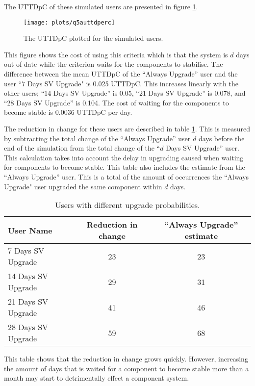 The UTTDpC of these simulated users are presented in figure \ref{exp.q5auttdperc}.
\begin{figure}[htp]
\begin{center}
  \texttt{[image: plots/q5auttdperc]}
  \caption{The UTTDpC plotted for the simulated users.}
  \label{exp.q5auttdperc}
\end{center}
\end{figure}

This figure shows the cost of using this criteria which is that the system is $d$ days out-of-date while the criterion waits for the components to stabilise.
The difference between the mean UTTDpC of the ``Always Upgrade'' user and the user ``7 Days SV Upgrade" is 0.025 UTTDpC.
This increases linearly with the other users; ``14 Days SV Upgrade'' is 0.05, ``21 Days SV Upgrade'' is 0.078, and ``28 Days SV Upgrade'' is 0.104.
The cost of waiting for the components to become stable is 0.0036 UTTDpC per day.

The reduction in change for these users are described in table \ref{exp.tblsvchange}.
This is measured by subtracting the total change of the ``Always Upgrade'' user $d$ days before the end of the simulation
from the total change of the  ``$d$ Days SV Upgrade'' user.
This calculation takes into account the delay in upgrading caused when waiting for components to become stable.
This table also includes the estimate from the ``Always Upgrade'' user.
This is a total of the amount of occurrences the ``Always Upgrade" user upgraded the same component within $d$ days.
\begin{table}[h!]
\centering
\begin{tabular}{|l | c | c | }
\hline
User Name 				& Reduction in change 	& ``Always Upgrade'' estimate		\\ \hline
7 Days SV Upgrade		& 23 					& 23 			 \\
14 Days SV Upgrade		& 29	 				& 31			\\
21 Days SV Upgrade		& 41 					& 46 			 \\
28 Days SV Upgrade 		& 59 					& 68			\\ \hline
\end{tabular}
\caption{Users with different upgrade probabilities.}
\label{exp.tblsvchange}
\end{table}

This table shows that the reduction in change grows quickly.
However, increasing the amount of days that is waited for a component to become stable more than a month may start to detrimentally effect a component system.

